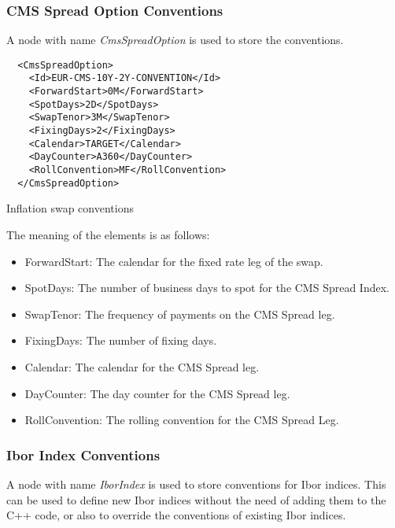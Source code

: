 \subsubsection{CMS Spread Option Conventions}

A node with name \emph{CmsSpreadOption} is used to store the conventions.

\begin{listing}[H]
\begin{verbatim}
  <CmsSpreadOption>
    <Id>EUR-CMS-10Y-2Y-CONVENTION</Id>
    <ForwardStart>0M</ForwardStart>
    <SpotDays>2D</SpotDays>
    <SwapTenor>3M</SwapTenor>
    <FixingDays>2</FixingDays>
    <Calendar>TARGET</Calendar>
    <DayCounter>A360</DayCounter>
    <RollConvention>MF</RollConvention>
  </CmsSpreadOption>
\end{verbatim}
\caption{Inflation swap conventions}
\label{lst:cms_spread_option_conventions}
\end{listing}

The meaning of the elements is as follows:

\begin{itemize}
\item ForwardStart: The calendar for the fixed rate leg of the swap.
\item SpotDays: The number of business days to spot for the CMS Spread Index.
\item SwapTenor: The frequency of payments on the CMS Spread leg.
\item FixingDays: The number of fixing days.
\item Calendar: The calendar for the CMS Spread leg.
\item DayCounter: The day counter for the CMS Spread leg.
\item RollConvention: The rolling convention for the CMS Spread Leg.
\end{itemize}

\subsubsection{Ibor Index Conventions}

A node with name \emph{IborIndex} is used to store conventions for Ibor indices. This can be used to define new Ibor
indices without the need of adding them to the C++ code, or also to override the conventions of existing Ibor indices.

